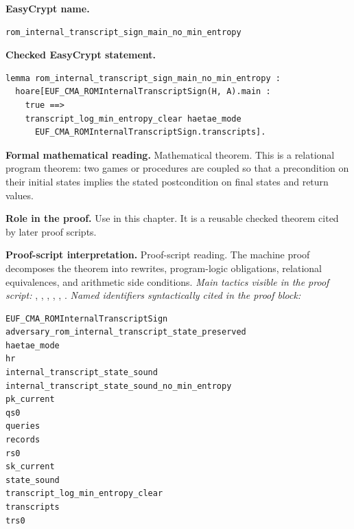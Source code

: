 \begin{formaltheorem}
\noindent\textbf{EasyCrypt name.}
\begin{lstlisting}[language=EasyCrypt,basicstyle=\ttfamily\scriptsize]
rom_internal_transcript_sign_main_no_min_entropy
\end{lstlisting}
\noindent\textbf{Checked EasyCrypt statement.}
\begin{lstlisting}[language=EasyCrypt,basicstyle=\ttfamily\scriptsize]
lemma rom_internal_transcript_sign_main_no_min_entropy :
  hoare[EUF_CMA_ROMInternalTranscriptSign(H, A).main :
    true ==>
    transcript_log_min_entropy_clear haetae_mode
      EUF_CMA_ROMInternalTranscriptSign.transcripts].
\end{lstlisting}
\noindent\textbf{Formal mathematical reading.}
Mathematical theorem. This is a relational program theorem: two games or procedures are coupled so that a precondition on their initial states implies the stated postcondition on final states and return values.

\noindent\textbf{Role in the proof.}
Use in this chapter. It is a reusable checked theorem cited by later proof scripts.

\noindent\textbf{Proof-script interpretation.}
Proof-script reading. The machine proof decomposes the theorem into rewrites, program-logic obligations, relational equivalences, and arithmetic side conditions.
\emph{Main tactics visible in the proof script:} , , , , , .
\emph{Named identifiers syntactically cited in the proof block:}
\begin{lstlisting}[language=EasyCrypt,basicstyle=\ttfamily\scriptsize]
EUF_CMA_ROMInternalTranscriptSign
adversary_rom_internal_transcript_state_preserved
haetae_mode
hr
internal_transcript_state_sound
internal_transcript_state_sound_no_min_entropy
pk_current
qs0
queries
records
rs0
sk_current
state_sound
transcript_log_min_entropy_clear
transcripts
trs0
\end{lstlisting}

\end{formaltheorem}

